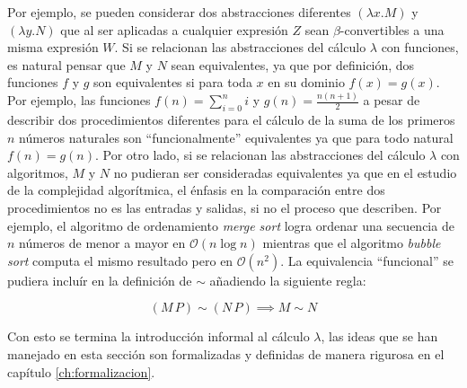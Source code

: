 Por ejemplo, se pueden considerar dos abstracciones diferentes \( (λx.M) \) y \( (λy.N) \) que al ser aplicadas a cualquier expresión \( Z \) sean \( β \)-convertibles a una misma expresión \( W \). Si se relacionan las abstracciones del cálculo \( λ \) con funciones, es natural pensar que \( M \) y \( N \) sean equivalentes, ya que por definición, dos funciones \( f \) y \( g \) son equivalentes si para toda \( x \) en su dominio \( f(x)=g(x) \). Por ejemplo, las funciones \( f(n)=\sum_{i=0}^{n}i \) y \( g(n)=\frac{n(n+1)}{2} \) a pesar de describir dos procedimientos diferentes para el cálculo de la suma de los primeros \( n \) números naturales son ``funcionalmente'' equivalentes ya que para todo natural \( f(n)=g(n) \). Por otro lado, si se relacionan las abstracciones del cálculo \( λ \) con algoritmos, \( M \) y \( N \) no pudieran ser consideradas equivalentes ya que en el estudio de la complejidad algorítmica, el énfasis en la comparación entre dos procedimientos no es las entradas y salidas, si no el proceso que describen. Por ejemplo, el algoritmo de ordenamiento \emph{merge sort} logra ordenar una secuencia de \( n \) números de menor a mayor en \( \mathcal{O}(n \log n) \) mientras que el algoritmo \emph{bubble sort} computa el mismo resultado pero en \( \mathcal{O}(n^2) \).  La equivalencia ``funcional'' se pudiera incluír en la definición de \( \sim \) añadiendo la siguiente regla:

\[ (M\, P) \sim (N\, P) \implies M \sim N \]

Con esto se termina la introducción informal al cálculo \( λ \), las ideas que se han manejado en esta sección son formalizadas y definidas de manera rigurosa en el capítulo \ref{ch:formalizacion}.

